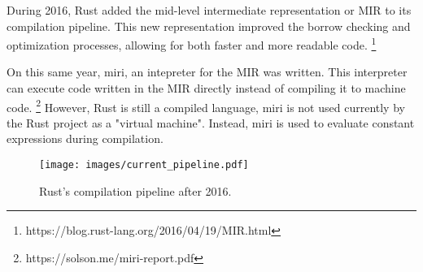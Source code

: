 During 2016, Rust added the mid-level intermediate representation or MIR to its compilation pipeline. This new representation improved the borrow checking and optimization processes, allowing for both faster and more readable code. \footnote{https://blog.rust-lang.org/2016/04/19/MIR.html} 

On this same year, miri, an intepreter for the MIR was written. This interpreter can execute code written in the MIR directly instead of compiling it to machine code. \footnote{https://solson.me/miri-report.pdf} However, Rust is still a compiled language, miri is not used currently by the Rust project as a "virtual machine". Instead, miri is used to evaluate constant expressions during compilation.

\begin{figure}[h]
  \centering
  \texttt{[image: images/current\_pipeline.pdf]}
  \caption{Rust's compilation pipeline after 2016.}
\end{figure}
